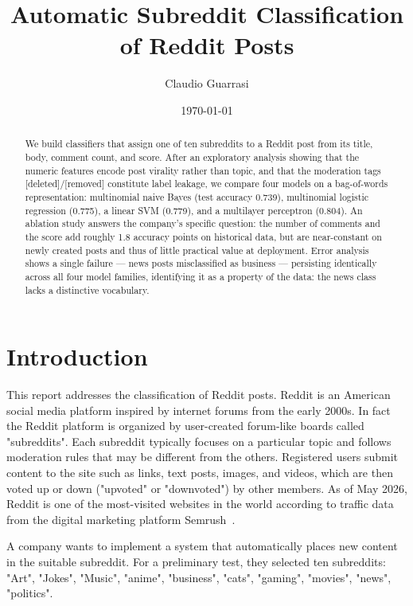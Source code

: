 \documentclass[11pt,a4paper]{article}
\title{\textbf{Automatic Subreddit Classification of Reddit Posts}}
\author{Claudio Guarrasi\\[1ex]}
\date{\today}
\begin{document}
\maketitle
\begin{abstract}
 We build classifiers that assign one of ten subreddits to a Reddit post from its title, body, comment count, and score. After an exploratory analysis showing that the numeric features encode post virality rather  than topic, and that the moderation tags [deleted]/[removed] constitute label leakage, we compare four models on a bag-of-words representation: multinomial naive Bayes (test accuracy 0.739), multinomial logistic regression (0.775), a linear SVM (0.779), and a multilayer perceptron (0.804). An ablation study answers the company's specific question: the number of comments and the score add roughly 1.8 accuracy points on historical data, but are near-constant on newly created posts and thus of little practical value at deployment. Error analysis shows a single failure --- news posts misclassified as business --- persisting identically across all four model families, identifying it as a property of the data: the news class lacks a distinctive vocabulary.
\end{abstract}

\tableofcontents





\section{Introduction}
\label{sec:intro}
This report addresses the classification of Reddit posts.
Reddit is an American social media platform inspired by internet forums from the early 2000s. In fact the Reddit platform is organized by user-created forum-like boards called "subreddits". Each subreddit typically focuses on a particular topic and follows moderation rules that may be different from the others.
Registered users submit content to the site such as links, text posts, images, and videos, which are then voted up or down ("upvoted" or "downvoted") by other members.
As of May 2026, Reddit is one of the most-visited websites in the world according to traffic data from the digital marketing platform Semrush~\cite{semrush2026}.

A company wants to implement a system that automatically places new content in the suitable subreddit. For a preliminary test, they selected ten subreddits: "Art", "Jokes", "Music", "anime", "business", "cats", "gaming", "movies", "news", "politics".
\end{document}
